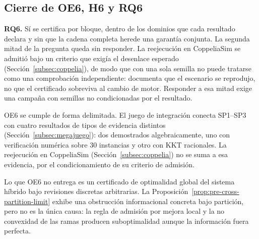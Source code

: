 \subsection{Cierre de OE6, H6 y RQ6}
\label{subsec:conclusions-megajuego}

\textbf{RQ6.} Sí se certifica por bloque, dentro de los dominios que cada
resultado declara y sin que la cadena completa herede una garantía conjunta.
La segunda mitad de la pregunta queda sin responder. La reejecución en
CoppeliaSim se admitió bajo un criterio que exigía el desenlace esperado
(Sección~\ref{subsec:coppelia}), de modo que con una sola semilla no puede
tratarse como una comprobación independiente: documenta que el escenario se
reprodujo, no que el certificado sobreviva al cambio de motor. Responder a esa
mitad exige una campaña con semillas no condicionadas por el resultado.

OE6 se cumple de forma delimitada. El juego de integración conecta SP1--SP3 con
cuatro resultados de tipos de evidencia distintos
(Sección~\ref{subsec:megajuego}): dos demostrados algebraicamente, uno con
verificación numérica sobre 30 instancias y otro con KKT racionales. La
reejecución en CoppeliaSim (Sección~\ref{subsec:coppelia}) no se suma a esa
evidencia, por el condicionamiento de su criterio de admisión.

Lo que OE6 no entrega es un certificado de optimalidad global del sistema
híbrido bajo revisiones discretas arbitrarias. La
Proposición~\ref{prop:pre-cross-partition-limit} exhibe una obstrucción
informacional concreta bajo partición, pero no es la única causa: la regla de
admisión por mejora local y la no convexidad de las ramas producen
suboptimalidad aunque la información fuera perfecta.

